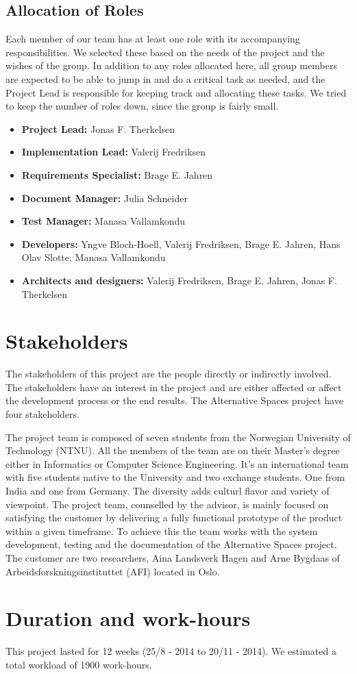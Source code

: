 \subsection{Allocation of Roles}
Each member of our team has at least one role with its accompanying responsibilities. We selected these based on the needs of the project and the wishes of the group. In addition to any roles allocated here, all group members are expected to be able to jump in and do a critical task as needed, and the Project Lead is responsible for keeping track and allocating these tasks. We tried to keep the number of roles down, since the group is fairly small.

\begin{itemize}
\item \textbf{Project Lead: } Jonas F. Therkelsen
\item \textbf{Implementation Lead: } Valerij Fredriksen
\item \textbf{Requirements Specialist: } Brage E. Jahren
\item \textbf{Document Manager: } Julia Schneider
\item \textbf{Test Manager: } Manasa Vallamkondu
\item \textbf{Developers: } Yngve Bloch-Hoell, Valerij Fredriksen, Brage E. Jahren, Hans Olav Slotte, Manasa Vallamkondu
\item \textbf{Architects and designers: } Valerij Fredriksen, Brage E. Jahren, Jonas F. Therkelsen 
\end{itemize}

\section{Stakeholders}

The stakeholders of this project are the people directly or indirectly involved. The stakeholders have an interest in the project and are either affected or affect the development process or the end results. The Alternative Spaces project have four stakeholders. 

The project team is composed of seven students from the Norwegian University of Technology (NTNU). All the members of the team are on their Master's degree either in Informatics or Computer Science Engineering. It's an international team with five students native to the University and two exchange students. One from India and one from Germany. The diversity adds culturl flavor and variety of viewpoint. The project team, counselled by the advisor, is mainly focused on satisfying the customer by delivering a fully functional prototype of the product within a given timeframe. To achieve this the team works with the system development, testing and the documentation of the Alternative Spaces project. 
The customer are two researchers, Aina Landsverk Hagen and Arne Bygdaas of Arbeidsforskningsinstituttet (AFI) located in Oslo. 

\section{Duration and work-hours} This project lasted for 12 weeks (25/8 - 2014 to 20/11 - 2014). We estimated a total workload of 1900 work-hours.